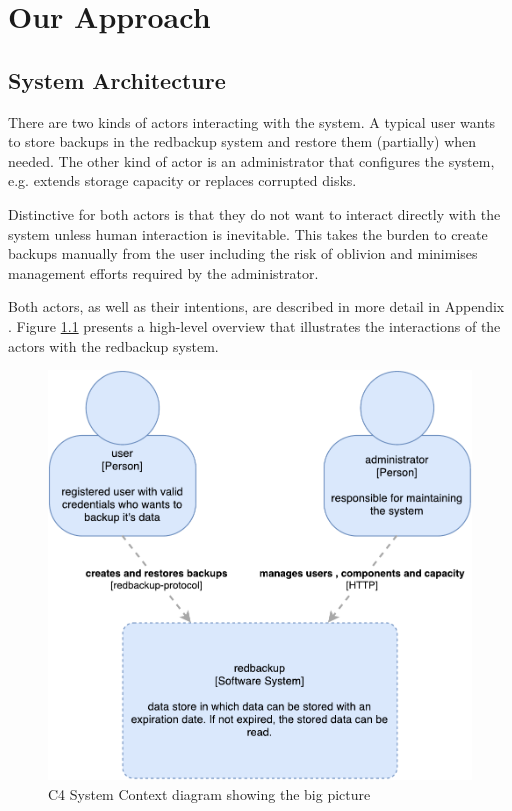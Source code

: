 \chapter{Our Approach}
\label{sec:our-approach}

\section{System Architecture}

There are two kinds of actors interacting with the system. A typical \gls{user} wants to store backups in the redbackup system and restore them (partially) when needed. The other kind of actor is an \gls{administrator} that configures the system, e.g. extends storage capacity or replaces corrupted disks.

Distinctive for both actors is that they do not want to interact directly with the system unless human interaction is inevitable. This takes the burden to create backups manually from the user including the risk of oblivion and minimises management efforts required by the administrator.  

Both actors, as well as their intentions, are described in more detail in Appendix . Figure \ref{fig:c4-overview} presents a high-level overview that illustrates the interactions of the actors with the redbackup system.

\begin{figure}[h]
	\centering
	\includegraphics[width=0.7\linewidth]{resources/c4-overview}
	\caption[C4 System Context diagram]{C4 System Context diagram showing the big picture}
	\label{fig:c4-overview}
\end{figure}

